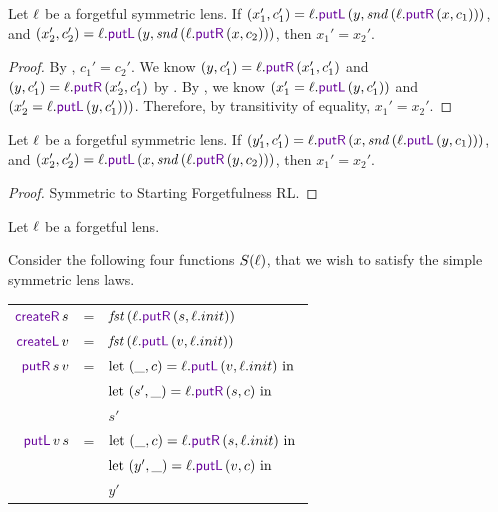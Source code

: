 \documentclass[acmsmall,screen,anonymous]{acmart}
\begin{document}
\begin{property}
  \label{prop:forget-rl}
  Let $\mathit{\ell}$ be a forgetful symmetric lens.  If $(x_1',c_1') = \Lens.\PutL \App
  (y,\Snd \App (\Lens.\PutR \App (x,c_1)))$, and
  $(x_2',c_2') = \Lens.\PutL \App
  (y,\Snd \App (\Lens.\PutR \App (x,c_2)))$, then $x_1' = x_2'$.
\end{property}
\begin{proof}
  By \ForgetfulRL, $c_1' = c_2'$. We know $(y,c_1') = \Lens.\PutR \App
  (x_1',c_1')$ and $(y,c_1') = \Lens.\PutR \App (x_2',c_1')$ by \PutLR. By
  \PutRL, we know $(x_1' = \Lens.\PutL \App (y,c_1'))$ and $(x_2' = \Lens.\PutL
  \App (y,c_1')))$. Therefore, by transitivity of equality, $x_1' = x_2'$.
\end{proof}

\begin{property}
  \label{prop:forget-lr}
  Let $\mathit{\ell}$ be a forgetful symmetric lens.  If $(y_1',c_1') = \Lens.\PutR \App
  (x,\Snd \App (\Lens.\PutL \App (y,c_1)))$, and
  $(x_2',c_2') = \Lens.\PutL \App
  (x,\Snd \App (\Lens.\PutR \App (y,c_2)))$,
  then $x_1' = x_2'$.
\end{property}
\begin{proof}
  Symmetric to Starting Forgetfulness RL.
\end{proof}

\begin{definition}[S]
  Let $\mathit{\ell}$ be a forgetful lens.

  Consider the following four functions $S(\mathit{\ell})$, that we wish to satisfy the
  simple symmetric lens laws.

  \begin{centering}
    \begin{tabular}{@{}r@{\ }c@{\ }l@{}}
      $\CreateR{} \App s$
      & =
      & $\Fst \App (\Lens.\PutR{} \App (s,\Lens.init))$\\
      
      $\CreateL{} \App v$
      & =
      & $\Fst \App (\Lens.\PutL{} \App (v,\Lens.init))$\\
      
      $\PutR{} \App s \App v$
      & =
      & $\LetIn{(\_,c)}{\Lens.\PutL \App (v,\Lens.init)}$\\
      &
      & $\LetIn{(s',\_)}{\Lens.\PutR \App (s,c)}$\\
      &
      & $s'$\\
      
      $\PutL{} \App v \App s$
      & =
      & $\LetIn{(\_,c)}{\Lens.\PutR \App (s,\Lens.init)}$\\
      &
      & $\LetIn{(y',\_)}{\Lens.\PutL \App (v,c)}$\\
      &
      & $y'$\\
    \end{tabular}
  \end{centering}
\end{definition}
\end{document}
